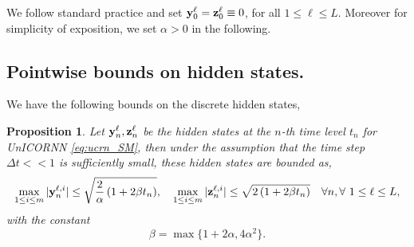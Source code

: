 \documentclass{article}
\newtheorem{proposition}[theorem]{Proposition}
\newcommand{\by}{{\bf y}}
\newcommand{\bz}{{\bf z}}
\newcommand{\Dt}{{\Delta t}}
\begin{document}
We follow standard practice and set $\by^\ell_0 = \bz^\ell_0 \equiv 0$, for all $1 \leq \ell \leq L$. Moreover for simplicity of exposition, we set $\alpha > 0$ in the following. 
\subsection{Pointwise bounds on hidden states.}
We have the following bounds on the discrete hidden states, 
\begin{proposition}
\label{prop:31}
Let $\by^{\ell}_n,\bz^{\ell}_n$ be the hidden states at the $n$-th time level $t_n$ for UnICORNN \eqref{eq:ucrn_SM}, then under the assumption that the time step $\Dt << 1$ is sufficiently small, these hidden states are bounded as,
\begin{equation}
\label{eq:hsbd}
\max\limits_{1 \leq i \leq m} |\by^{\ell,i}_n| \leq \sqrt{\frac{2}{\alpha}\left(1+2\beta t_n\right)}, \quad \max\limits_{1 \leq i \leq m} |\bz^{\ell,i}_n| \leq \sqrt{2\left(1+2\beta t_n\right)} \quad \forall n, \forall~1 \leq \ell \leq L,
\end{equation}
with the constant 
$$
\beta=\max\{1+2\alpha,4\alpha^2\}.
$$
\end{proposition}
\end{document}
